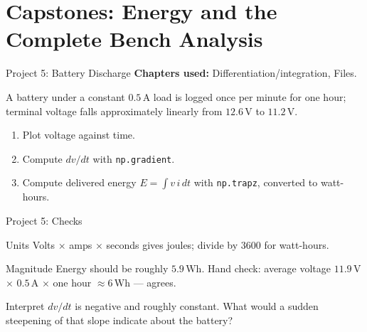\documentclass[9pt,aspectratio=169,xcolor=table]{beamer}
\begin{document}
\section{Capstones: Energy and the Complete Bench Analysis}

\begin{frame}{Project 5: Battery Discharge}
    \leavevmode
    \textbf{Chapters used:} Differentiation/integration, Files.

    \vspace{2mm}
    A battery under a constant $0.5\,\text{A}$ load is logged once per
    minute for one hour; terminal voltage falls approximately linearly
    from $12.6\,\text{V}$ to $11.2\,\text{V}$.

    \vspace{2mm}
    \begin{enumerate}
        \item Plot voltage against time.
        \item Compute $dv/dt$ with \texttt{np.gradient}.
        \item Compute delivered energy $E = \int v\,i\,dt$ with
              \texttt{np.trapz}, converted to watt-hours.
    \end{enumerate}
\end{frame}

\begin{frame}{Project 5: Checks}
    \leavevmode
    \begin{block}{Units}
        Volts $\times$ amps $\times$ seconds gives joules; divide by
        $3600$ for watt-hours.
    \end{block}

    \vspace{2mm}
    \begin{block}{Magnitude}
        Energy should be roughly $5.9\,\text{Wh}$. Hand check: average
        voltage $11.9\,\text{V}$ $\times$ $0.5\,\text{A}$ $\times$ one
        hour $\approx 6\,\text{Wh}$ --- agrees.
    \end{block}

    \vspace{2mm}
    \begin{alertblock}{Interpret}
        $dv/dt$ is negative and roughly constant. What would a sudden
        \alert{steepening} of that slope indicate about the battery?
    \end{alertblock}
\end{frame}
\end{document}
